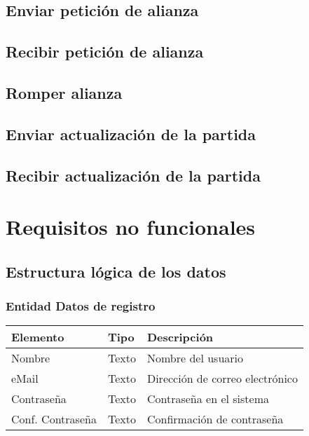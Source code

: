 \subsection{Enviar petición de alianza}

\subsection{Recibir petición de alianza}

\subsection{Romper alianza}

\subsection{Enviar actualización de la partida}

\subsection{Recibir actualización de la partida}

\section{Requisitos no funcionales}

\subsection{Estructura lógica de los datos}

\subsubsection{Entidad Datos de registro}
\begin{tabularx}{0.9\textwidth}{llX}
\hline
\textbf{Elemento} & \textbf{Tipo} & \textbf{Descripción} \\
\hline
Nombre & Texto & Nombre del usuario \\
eMail & Texto & Dirección de correo electrónico \\
Contraseña & Texto & Contraseña en el sistema \\
Conf. Contraseña & Texto & Confirmación de contraseña \\
\hline
\end{tabularx}
